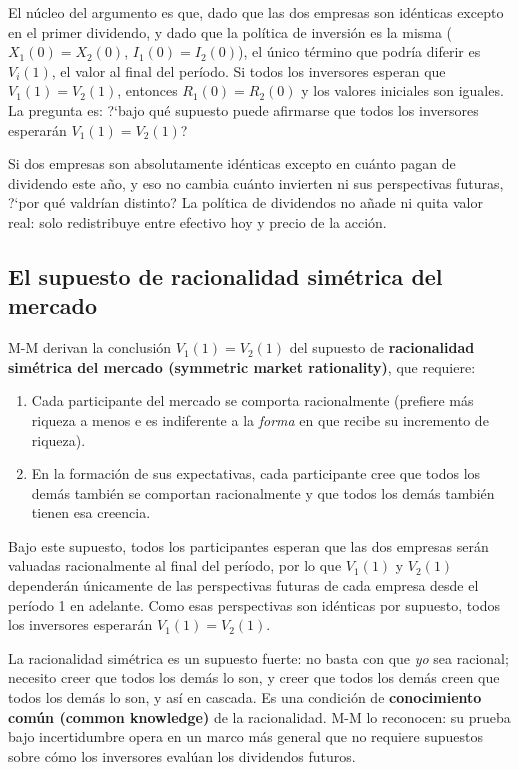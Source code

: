 \documentclass[12pt]{article}
\begin{document}
\begin{explicacion}
El n\'ucleo del argumento es que, dado que las dos empresas son id\'enticas excepto en el primer dividendo, y dado que la pol\'itica de inversi\'on es la misma ($X_1(0) = X_2(0)$, $I_1(0) = I_2(0)$), el \'unico t\'ermino que podr\'ia diferir es $V_i(1)$, el valor al final del per\'iodo. Si todos los inversores esperan que $V_1(1) = V_2(1)$, entonces $R_1(0) = R_2(0)$ y los valores iniciales son iguales. La pregunta es: ?`bajo qu\'e supuesto puede afirmarse que todos los inversores esperar\'an $V_1(1) = V_2(1)$?
\end{explicacion}

\begin{intuicion}
Si dos empresas son absolutamente id\'enticas excepto en cu\'anto pagan de dividendo este a\~no, y eso no cambia cu\'anto invierten ni sus perspectivas futuras, ?`por qu\'e valdr\'ian distinto? La pol\'itica de dividendos no a\~nade ni quita valor real: solo redistribuye entre efectivo hoy y precio de la acci\'on.
\end{intuicion}

\subsection{El supuesto de racionalidad sim\'etrica del mercado}

M-M derivan la conclusi\'on $V_1(1) = V_2(1)$ del supuesto de \textbf{racionalidad sim\'etrica del mercado (symmetric market rationality)}, que requiere:
\begin{enumerate}
  \item Cada participante del mercado se comporta racionalmente (prefiere m\'as riqueza a menos e es indiferente a la \textit{forma} en que recibe su incremento de riqueza).
  \item En la formaci\'on de sus expectativas, cada participante cree que todos los dem\'as tambi\'en se comportan racionalmente y que todos los dem\'as tambi\'en tienen esa creencia.
\end{enumerate}

Bajo este supuesto, todos los participantes esperan que las dos empresas ser\'an valuadas racionalmente al final del per\'iodo, por lo que $V_1(1)$ y $V_2(1)$ depender\'an \'unicamente de las perspectivas futuras de cada empresa desde el per\'iodo 1 en adelante. Como esas perspectivas son id\'enticas por supuesto, todos los inversores esperar\'an $V_1(1) = V_2(1)$.

\begin{explicacion}
La racionalidad sim\'etrica es un supuesto fuerte: no basta con que \textit{yo} sea racional; necesito creer que todos los dem\'as lo son, y creer que todos los dem\'as creen que todos los dem\'as lo son, y as\'i en cascada. Es una condici\'on de \textbf{conocimiento com\'un (common knowledge)} de la racionalidad. M-M lo reconocen: su prueba bajo incertidumbre opera en un marco m\'as general que no requiere supuestos sobre c\'omo los inversores eval\'uan los dividendos futuros.
\end{explicacion}
\end{document}
